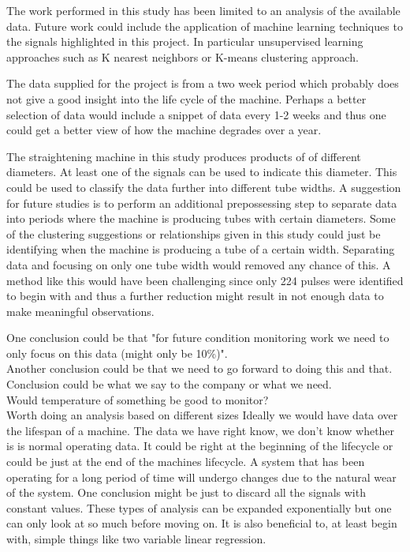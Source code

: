 \documentclass{article}
\begin{document}
The work performed in this study has been limited to an analysis of the available data. Future work could include the application of machine learning techniques to the signals highlighted in this project. In particular unsupervised learning approaches such as K nearest neighbors or K-means clustering approach.

The data supplied for the project is from a two week period which probably does not give a good insight into the life cycle of the machine. Perhaps a better selection of data would include a snippet of data every 1-2 weeks and thus one could get a better view of how the machine degrades over a year.

The straightening machine in this study produces products of of different diameters. At least one of the signals can be used to indicate this diameter. This could be used to classify the data further into different tube widths. A suggestion for future studies is to perform an additional prepossessing step to separate data into periods where the machine is producing tubes with certain diameters. Some of the clustering suggestions or relationships given in this study could just be identifying when the machine is producing a tube of a certain width. Separating data and focusing on only one tube width would removed any chance of this. A method like this would have been challenging since only 224 pulses were identified to begin with and thus a further reduction might result in not enough data to make meaningful observations.

One conclusion could be that "for future condition monitoring work we need to only focus on this data (might only be 10\%)".\\
Another conclusion could be that we need to go forward to doing this and that.\\
Conclusion could be what we say to the company or what we need.\\
Would temperature of something be good to monitor?\\
Worth doing an analysis based on different sizes
Ideally we would have data over the lifespan of a machine. The data we have right know, we don't know whether is is normal operating data. It could be right at the beginning of the lifecycle or could be just at the end of the machines lifecycle. A system that has been operating for a long period of time will undergo changes due to the natural wear of the system.
One conclusion might be just to discard all the signals with constant values.
These types of analysis can be expanded exponentially but one can only look at so much before moving on. It is also beneficial to, at least begin with, simple things like two variable linear regression.
\end{document}
